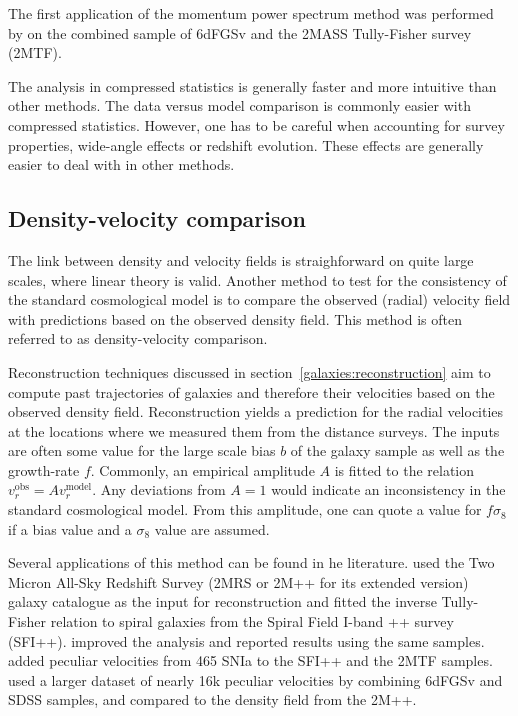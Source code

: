     The first application of the momentum power spectrum method was 
    performed by \cite{qinRedshiftspaceMomentumPower2019} on the combined 
    sample of 6dFGSv and the 2MASS Tully-Fisher survey (2MTF). 

    The analysis in compressed statistics is generally faster and more intuitive
    than other methods. The data versus model comparison is commonly easier with 
    compressed statistics. However, one has to be careful when accounting for 
    survey properties, wide-angle effects or redshift evolution. These effects
    are generally easier to deal with in other methods. 


    \subsection{Density-velocity comparison}
    \label{velocities:methods:comparison}

    The link between density and velocity fields is straighforward 
    on quite large scales, where linear theory is valid. 
    Another method to test for the consistency of the standard cosmological model 
    is to compare the observed (radial) velocity field with 
    predictions based on the observed density field. 
    This method is often referred to as density-velocity comparison.  

    Reconstruction techniques discussed in section~\ref{galaxies:reconstruction}
    aim to compute past trajectories of galaxies and therefore their velocities based 
    on the observed density field. Reconstruction yields a prediction for the radial 
    velocities at the locations where we measured them from the distance surveys.
    The inputs are often some value for the large scale bias $b$ of the galaxy sample 
    as well as the growth-rate $f$.  
    Commonly, an empirical amplitude $A$ is fitted to the relation $v_r^\text{obs} = A v_r^\text{model}$. 
    Any deviations from $A=1$ would indicate an inconsistency in the standard 
    cosmological model. From this amplitude, one can quote a value for $f\sigma_8$ 
    if a bias value and a $\sigma_8$ value are assumed.  

    Several applications of this method can be found in he literature. 
    \cite{davisLocalGravityLocal2011} used the Two Micron All-Sky Redshift Survey 
    (2MRS or 2M++ for its extended version) 
    galaxy catalogue as the input for reconstruction and fitted 
    the inverse Tully-Fisher relation to spiral galaxies from the 
    Spiral Field I-band ++ survey (SFI++). 
    \cite{carrickCosmologicalParametersComparison2015} improved the analysis 
    and reported results using the same samples. 
    \cite{boruahCosmicFlowsNearby2020} added peculiar velocities from 465 SNIa 
    to the SFI++ and the 2MTF samples. 
    \cite{saidJointAnalysis6dFGS2020} used a larger dataset of nearly 16k peculiar velocities 
    by combining 6dFGSv and SDSS samples, and compared to the density field from the 2M++. 
    
